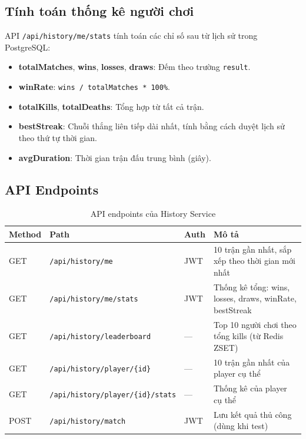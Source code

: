 \documentclass[12pt,a4paper]{report}
\begin{document}
\subsection{Tính toán thống kê người chơi}

API \texttt{/api/history/me/stats} tính toán các chỉ số sau từ lịch sử trong PostgreSQL:

\begin{itemize}
  \item \textbf{totalMatches}, \textbf{wins}, \textbf{losses}, \textbf{draws}: Đếm theo trường \texttt{result}.
  \item \textbf{winRate}: \texttt{wins / totalMatches * 100\%}.
  \item \textbf{totalKills}, \textbf{totalDeaths}: Tổng hợp từ tất cả trận.
  \item \textbf{bestStreak}: Chuỗi thắng liên tiếp dài nhất, tính bằng cách duyệt lịch sử theo thứ tự thời gian.
  \item \textbf{avgDuration}: Thời gian trận đấu trung bình (giây).
\end{itemize}

\subsection{API Endpoints}

\begin{table}[H]
\centering
\caption{API endpoints của History Service}
\label{tab:historyapi}
\begin{tabularx}{\textwidth}{lllX}
\toprule
\textbf{Method} & \textbf{Path} & \textbf{Auth} & \textbf{Mô tả} \\
\midrule
GET & \texttt{/api/history/me}                  & JWT & 10 trận gần nhất, sắp xếp theo thời gian mới nhất \\
GET & \texttt{/api/history/me/stats}            & JWT & Thống kê tổng: wins, losses, draws, winRate, bestStreak \\
GET & \texttt{/api/history/leaderboard}         & --- & Top 10 người chơi theo tổng kills (từ Redis ZSET) \\
GET & \texttt{/api/history/player/\{id\}}       & --- & 10 trận gần nhất của player cụ thể \\
GET & \texttt{/api/history/player/\{id\}/stats} & --- & Thống kê của player cụ thể \\
POST& \texttt{/api/history/match}               & JWT & Lưu kết quả thủ công (dùng khi test) \\
\bottomrule
\end{tabularx}
\end{table}
\end{document}
